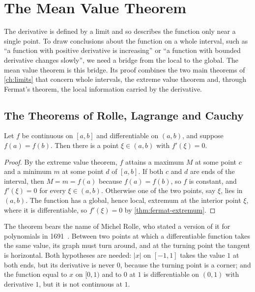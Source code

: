 \section{The Mean Value Theorem}
\label{sec:mvt}

The derivative is defined by a limit and so describes the function only near a single point. To draw conclusions about the function on a whole interval, such as ``a function with positive derivative is increasing'' or ``a function with bounded derivative changes slowly'', we need a bridge from the local to the global. The mean value theorem is this bridge. Its proof combines the two main theorems of \cref{ch:limits} that concern whole intervals, the extreme value theorem and, through Fermat's theorem, the local information carried by the derivative.

\subsection{The Theorems of Rolle, Lagrange and Cauchy}

\begin{theorem}[Rolle]
\label{thm:rolle}
Let $f$ be continuous on $[a,b]$ and differentiable on $(a,b)$, and suppose $f(a)=f(b)$. Then there is a point $\xi\in(a,b)$ with $f'(\xi)=0$.
\end{theorem}

\begin{proof}
By the extreme value theorem, $f$ attains a maximum $M$ at some point $c$ and a minimum $m$ at some point $d$ of $[a,b]$. If both $c$ and $d$ are ends of the interval, then $M=m=f(a)$ because $f(a)=f(b)$, so $f$ is constant, and $f'(\xi)=0$ for every $\xi\in(a,b)$. Otherwise one of the two points, say $\xi$, lies in $(a,b)$. The function has a global, hence local, extremum at the interior point $\xi$, where it is differentiable, so $f'(\xi)=0$ by \cref{thm:fermat-extremum}.
\end{proof}

The theorem bears the name of Michel Rolle, who stated a version of it for polynomials in 1691~\cite{barrowgreen2009}. Between two points at which a differentiable function takes the same value, its graph must turn around, and at the turning point the tangent is horizontal. Both hypotheses are needed: $|x|$ on $[-1,1]$ takes the value $1$ at both ends, but its derivative is never $0$, because the turning point is a corner; and the function equal to $x$ on $[0,1)$ and to $0$ at $1$ is differentiable on $(0,1)$ with derivative $1$, but it is not continuous at $1$.

